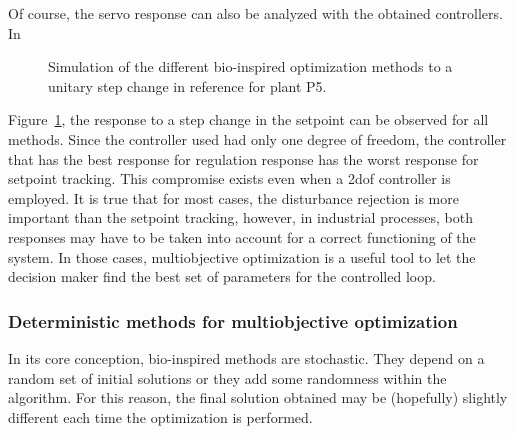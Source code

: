 Of course, the servo response can also be analyzed with the obtained controllers. In %
%
\begin{figure}[tb]%
	\centering
	\caption{Simulation of the different bio-inspired optimization methods to a unitary step change in reference for plant P5.}%
	\label{fig:Reference}%
\end{figure}
%
Figure~\ref{fig:Reference}, the response to a step change in the setpoint can be observed for all methods. Since the controller used had only one degree of freedom, the controller that has the best response for regulation response has the worst response for setpoint tracking. This compromise exists even when a \gls{2dof} controller is employed. It is true that for most cases, the disturbance rejection is more important than the setpoint tracking, however, in industrial processes, both responses may have to be taken into account for a correct functioning of the system. In those cases, multiobjective optimization is a useful tool to let the decision maker find the best set of parameters for the controlled loop.

\subsubsection{Deterministic methods for multiobjective optimization}

In its core conception, bio-inspired methods are stochastic. They depend on a random set of initial solutions or they add some randomness within the algorithm. For this reason, the final solution obtained may be (hopefully) slightly different each time the optimization is performed.

